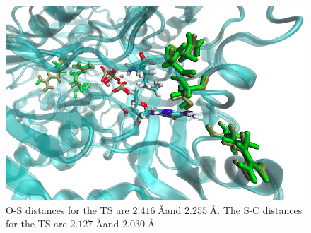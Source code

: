 \documentclass[a4paper,8pt]{beamer}
\begin{document}
\begin{frame}
\begin{figure}
\centering
\includegraphics[scale=0.4]{figures/tsdiff.png}
\caption{O-S distances for the TS are $2.416\;$\AA and $2.255\;$\AA. The S-C distances for the TS are $2.127\;$\AA and $2.030\;$\AA}
\end{figure}
\end{frame}

%

%
%
%
\end{document}
